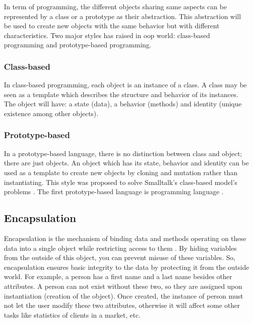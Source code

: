 \documentclass[12pt]{book}
\begin{document}
In term of programming, the different objects sharing same aspects can be represented by a class or a prototype as their abstraction. 
This abstraction will be used to create new objects with the same behavior but with different characteristics. 
Two major styles has raised in \ac{oop} world: class-based programming and prototype-based programming.

\subsubsection{Class-based}

In class-based programming, each object is an instance of a class. 
A class may be seen as a template which describes the structure and behavior of its instances.
The object will have: a state (data), a behavior (methods) and identity (unique existence among other objects).

\subsubsection{Prototype-based}

In a prototype-based language, there is no distinction between class and object; there are just objects. 
An object which has its state, behavior and identity can be used as a template to create new objects by cloning and mutation rather than instantiating.
This style was proposed to solve Smalltalk's class-based model's problems \citep{1986-borning}.
The first prototype-based language is  programming language \citep{1991-ungar}.

\subsection{Encapsulation}

Encapsulation is the mechanism of binding data and methods operating on these data into a single object while restricting access to them \citep{2017-janssen-enc}. 
By hiding variables from the outside of this object, you can prevent misuse of these variables.
So, encapsulation ensures basic integrity to the data by protecting it from the outside world.
For example, a person has a first name and a last name besides other attributes. 
A person can not exist without these two, so they are assigned upon instantiation (creation of the object). 
Once created, the instance of person must not let the user modify these two attributes, otherwise it will affect some other tasks like statistics of clients in a market, etc. 
\end{document}
